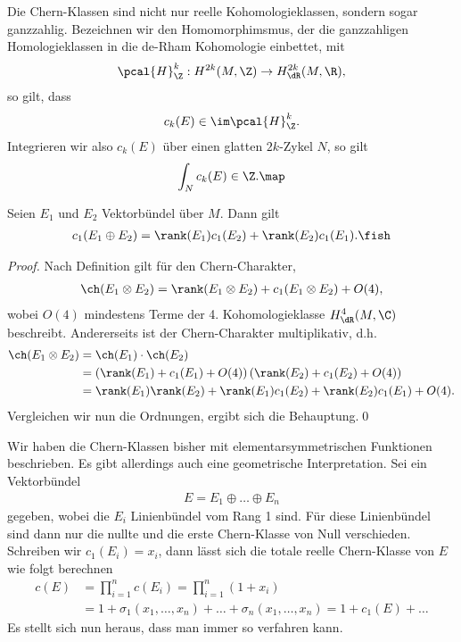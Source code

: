 \documentclass[%
	paper=a5,%
	fleqn,%
	DIV=18,%
	BCOR=0mm,
	fontsize=11pt,
	titlepage=false,%
	bibliography=totoc,
	DIV=18,%
	twoside=true,
	pdftitle=Riemannsche Geometrie,
	pdfauthor=Uwe Semmelmann,
	numbers=noendperiod]%
	{scrbook}
\begin{document}
\begin{rem}
Die Chern-Klassen sind nicht nur reelle Kohomologieklassen, sondern sogar ganzzahlig. Bezeichnen wir den Homomorphimsmus, der die ganzzahligen Homologieklassen in die de-Rham Kohomologie einbettet, mit
\begin{align*}
\pcal{H}_{\Z}^k : H^{2k}(M,\Z) \to H_{\dR}^{2k}(M,\R),
\end{align*}
so gilt, dass
\begin{align*}
c_{k}(E) \in \im \pcal{H}_{\Z}^k.
\end{align*}
Integrieren wir also $c_{k}(E)$ über einen glatten $2k$-Zykel $N$, so gilt
\begin{align*}
\int_{N} c_{k}(E) \in \Z.\map
\end{align*}
\end{rem}

\begin{lem}
Seien $E_{1}$ und $E_{2}$ Vektorbündel über $M$. Dann gilt
\begin{align*}
c_{1}(E_{1}\oplus E_{2}) = \rank(E_{1})c_{1}(E_{2}) + \rank(E_{2})c_{1}(E_{1}).\fish
\end{align*}
\end{lem}
\begin{proof}
Nach Definition gilt für den Chern-Charakter,
\begin{align*}
\ch(E_{1}\otimes E_{2}) = \rank(E_{1}\otimes E_{2}) + c_{1}(E_{1}\otimes E_{2}) + O(4),
\end{align*}
wobei $O(4)$ mindestens Terme der 4. Kohomologieklasse $H_{\dR}^4(M,\C)$ beschreibt. Andererseits ist der Chern-Charakter multiplikativ, d.h.
\begin{align*}
\ch(E_{1}\otimes E_{2}) &= \ch(E_{1})\cdot \ch(E_{2})\\
&= 
\left( \rank(E_{1}) + c_{1}(E_{1}) + O(4)\right)
\left( \rank(E_{2}) + c_{1}(E_{2}) + O(4)\right)\\
&= \rank(E_{1})\rank(E_{2}) + 
\rank(E_{1})c_{1}(E_{2}) + \rank(E_{2})c_{1}(E_{1}) + O(4).
\end{align*}
Vergleichen wir nun die Ordnungen, ergibt sich die Behauptung.\qed
\end{proof}

Wir haben die Chern-Klassen bisher mit elementarsymmetrischen Funktionen beschrieben. Es gibt allerdings auch eine geometrische Interpretation. Sei ein Vektorbündel
\begin{align*}
E = E_{1}\oplus \ldots \oplus E_{n}
\end{align*}
gegeben, wobei die $E_{i}$ Linienbündel vom Rang 1 sind. Für diese Linienbündel sind dann nur die nullte und die erste Chern-Klasse von Null verschieden. Schreiben wir $c_{1}(E_{i}) = x_{i}$, dann lässt sich die totale reelle Chern-Klasse von $E$ wie folgt berechnen
\begin{align*}
c(E) &= \prod_{i=1}^n c(E_{i}) = 
\prod_{i=1}^n (1+x_{i})\\
&= 1 + \sigma_{1}(x_{1},\ldots,x_{n}) + \ldots + \sigma_{n}(x_{1},\ldots,x_{n})
= 1 + c_{1}(E) + \ldots
\end{align*}
Es stellt sich nun heraus, dass man immer so verfahren kann.
\end{document}

